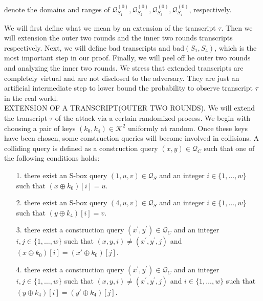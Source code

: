 \noindent denote the domains and ranges of $\mathcal{Q}_{S_{1}}^{(0)}, \mathcal{Q}_{S_{2}}^{(0)}, \mathcal{Q}_{S_{3}}^{(0)}, \mathcal{Q}_{S_{4}}^{(0)}$, respectively.

We will first define what we mean by an extension of the transcript $\tau$. Then we will extension the outer two rounds and the inner two rounds transcripts respectively. Next, we will define bad transcripts and bad$(S_1,S_4)$, which is the most important step in our proof. Finally, we will peel off he outer two rounds and analyzing the inner two rounds. We stress that extended transcripts are completely virtual and are not disclosed to the adversary. They are just an artificial intermediate step to lower bound the probability to observe transcript $\tau$ in the real world.\\

\noindent
\textsc{EXTENSION OF A TRANSCRIPT(OUTER TWO ROUNDS)}. We will extend the transcript $\tau$ of the attack via a certain randomized process. We begin with choosing a pair of keys $\left(k_{0}, k_{4}\right) \in \mathcal{K}^{2}$ uniformly at random. Once these keys have been chosen, some construction queries will become involved in collisions. A colliding query is defined as a construction query $(x, y) \in \mathcal{Q}_{C}$ such that one of the following conditions holds:

\begin{itemize}
  \item[1.]
  there exist an S-box query $(1, u, v) \in \mathcal{Q}_{S}$ and an integer $i \in\{1, \ldots, w\}$ such that $\left(x \oplus k_{0}\right)[i]=u$.
  \item[2.]
  there exist an S-box query $(4, u, v) \in \mathcal{Q}_{S}$ and an integer $i \in\{1, \ldots, w\}$ such that $\left(y \oplus k_{4}\right)[i]=v$.
  \item[3.]
  there exist a construction query $\left(x^{\prime}, y^{\prime}\right) \in \mathcal{Q}_{C}$ and an integer $i,j \in\{1, \ldots, w\}$ such that $(x, y, i) \neq\left(x^{\prime}, y^{\prime}, j\right)$ and $\left(x \oplus k_{0}\right)[i] = \left(x' \oplus k_{0}\right)[j]$.
  \item[4.]
  there exist a construction query $\left(x^{\prime}, y^{\prime}\right) \in \mathcal{Q}_{C}$ and an integer $i,j \in\{1, \ldots, w\}$ such that $(x, y, i) \neq\left(x^{\prime}, y^{\prime}, j\right)$ and $i \in\{1, \ldots, w\}$ such that $\left(y \oplus k_{4}\right)[i] = \left(y' \oplus k_{4}\right)[j]$.
\end{itemize}

